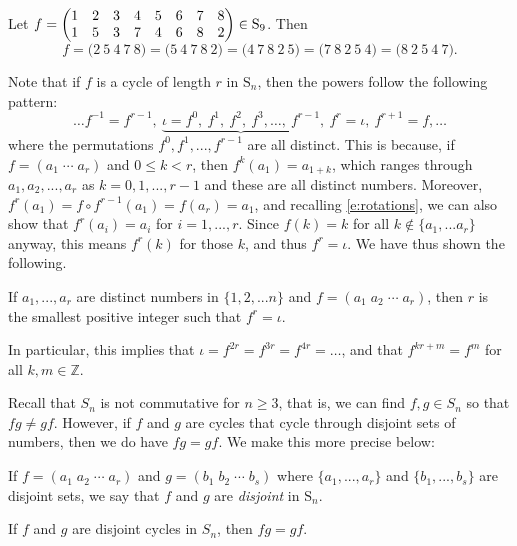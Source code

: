 \documentclass[11pt,dvipsnames]{book}
\numberwithin{equation}{section} %
\numberwithin{figure}{section} %
\numberwithin{table}{section} %
\begin{document}
\begin{example}
Let $f=\left(\begin{matrix} %
1 & 2 & 3 & 4 & 5 & 6 & 7 & 8 \cr%
1 & 5 & 3 & 7 & 4 & 6 & 8 & 2 \cr%
\end{matrix}\right)\in\mathrm{S}_{9}$.  Then
$$
f=\big(2\ 5\ 4\ 7\ 8\big)=\big(5\ 4\ 7\ 8\ 2\big)=\big(4\ 7\ 8\ 2\ 5\big)=\big(7\ 8\ 2\ 5\ 4\big)=\big(8\ 2\ 5\ 4\ 7\big).%
$$
\end{example}



Note that if $f$ is a cycle of length $r$ in $\mathrm{S}_n$, 
 then the powers follow the following pattern:
$$
\ldots f^{-1}=f^{r-1},\  \underbrace{\iota=f^{0},\ f^{1},\ f^{2},\ f^{3},\ldots,\ f^{r-1}},\  f^{r}=\iota,\  f^{r+1}=f,  \ldots%
$$
where the permutations $f^{0},f^{1},...,f^{r-1}$ are all distinct. This is because, if $f=(a_{1}\; \cdots \; a_{r})$ and $0\leq  k < r$, then $f^{k}(a_{1})=a_{1+k}$, which ranges through $a_{1},a_{2},...,a_{r}$ as $k=0,1,...,r-1$ and these are all distinct numbers. Moreover, $f^{r}(a_{1})=f\circ f^{r-1}(a_{1})=f(a_{r})=a_{1}$, and recalling \eqref{e:rotations}, we can also show that $f^{r}(a_{i})=a_{i}$ for $i=1,...,r$. Since $f(k)=k$ for all $k\not\in \{a_{1},...a_{r}\}$ anyway, this means $f^{r}(k)$ for those $k$, and thus $f^{r}=\iota$. We have thus shown the following.

 \begin{corollary}  If $a_{1},...,a_{r}$ are distinct numbers in $\{1,2,...n\}$ and $f=(a_{1}\; a_{2} \; \cdots \; a_{r})$, then $r$ is the smallest positive integer such
that $f^r=\iota$.
\end{corollary}

In particular, this implies that $\iota=f^{2r}=f^{3r}=f^{4r}=\ldots$, and that  $f^{kr+m}=f^{m}$ for all $k,m\in\mathbb{Z}$.

Recall that $S_{n}$ is not commutative for $n\geq 3$, that is, we can find $f,g\in S_{n}$ so that $fg\neq gf$. However, if $f$ and $g$ are cycles that cycle through disjoint sets of numbers, then we do have $fg=gf$. We make this more precise below:

\begin{definition}  If $f=(a_{1}\; a_{2}\; \cdots \; a_{r})$ and $g=(b_{1}\; b_{2}\; \cdots \; b_{s})$ where $\{a_{1},...,a_{r}\}$ and $\{b_{1},...,b_{s}\}$ are disjoint sets, we say that $f$ and $g$ are {\it disjoint} in $\mathrm{S}_{n}$.
\end{definition}

\begin{proposition}
If $f$ and $g$ are disjoint cycles in $S_{n}$, then $fg=gf$. 
\end{proposition}
\end{document}
